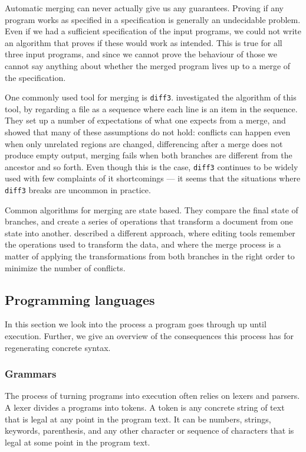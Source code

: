 \documentclass[11pt]{article}
\begin{document}
Automatic merging can never actually give us any guarantees. Proving if any program works as specified in a specification is generally an undecidable problem. Even if we had a sufficient specification of the input programs, we could not write an algorithm that proves if these would work as intended. This is true for all three input programs, and since we cannot prove the behaviour of those we cannot say anything about whether the merged program lives up to a merge of the specification.

One commonly used tool for merging is \texttt{diff3}. \citet{Khanna} investigated the algorithm of this tool, by regarding a file as a sequence where each line is an item in the sequence. They set up a number of expectations of what one expects from a merge, and showed that many of these assumptions do not hold: conflicts can happen even when only unrelated regions are changed, differencing after a merge does not produce empty output, merging fails when both branches are different from the ancestor and so forth. Even though this is the case, \texttt{diff3} continues to be widely used with few complaints of it shortcomings --- it seems that the situations where \texttt{diff3} breaks are uncommon in practice.

Common algorithms for merging are state based. They compare the final state of branches, and create a series of operations that transform a document from one state into another. \citet{Lippe} described a different approach, where editing tools remember the operations used to transform the data, and where the merge process is a matter of applying the transformations from both branches in the right order to minimize the number of conflicts.
\clearpage
\subsection{Programming languages}
In this section we look into the process a program goes through up until execution. Further, we give an overview of the consequences this process has for regenerating concrete syntax.

\subsubsection{Grammars}
The process of turning programs into execution often relies on lexers and parsers. A lexer divides a programs into tokens. A token is any concrete string of text that is legal at any point in the program text. It can be numbers, strings, keywords, parenthesis, and any other character or sequence of characters that is legal at some point in the program text. 
\end{document}
